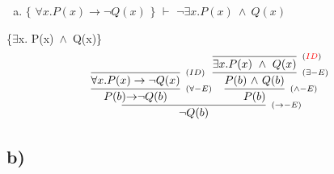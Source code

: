 \documentclass[aspectratio=43]{beamer}
\newcommand{\ria}{$\rightarrow$}
\newcommand{\ex}{$\exists$}
\newcommand{\nao}{$\neg$}
\newcommand{\andd}{$\wedge$}
\begin{document}
    \begin{frame}[fragile]
    	
    	\begin{enumerate}[b)]
			
			\item $\{$ $\forall x.P(x)\to \neg Q(x)$ $\}$ $\vdash$ $ \neg\exists  x.P(x)\ \wedge\ Q(x)$ \\ 
			
		\end{enumerate}
        \{\ex  x. P(x)\ \andd\ Q(x)\}
        \vspace{90pt}
        \[
        \begin{array}{c}
		
        	\infer[_{(\to-E)}]
            {$\nao$ Q(b)}
            {\infer[_{(\forall-E)}] 
            	{P(b) $\ria$ $\nao$ Q(b)}
               	{\infer[_{(ID)}]
                	{\forall x.P(x)\to \neg Q(x)}
                    {}
                }  
            \infer[_{(\land-E)}] 
                {P(b)} 
                {\infer[_{(\exists-E)}] 
                        	{P(b)\ $\andd$\ Q(b)}
                        	{\infer[_{(\textcolor{red}{ID})}]
                            	{\exists x.P(x)\ \wedge\ Q(x)}
                            	{}
                            }
                }
            }
		\end{array}
        \]
        
	\end{frame}
    
    \subsection{b)}
        
\end{document}
